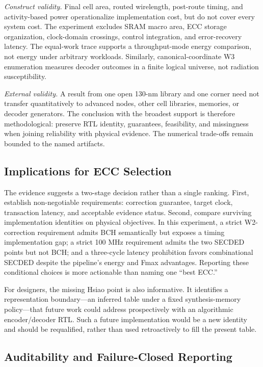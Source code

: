 \textit{Construct validity.} Final cell area, routed wirelength, post-route timing, and activity-based power operationalize implementation cost, but do not cover every system cost. The experiment excludes SRAM macro area, ECC storage organization, clock-domain crossings, control integration, and error-recovery latency. The equal-work trace supports a throughput-mode energy comparison, not energy under arbitrary workloads. Similarly, canonical-coordinate W3 enumeration measures decoder outcomes in a finite logical universe, not radiation susceptibility.

\textit{External validity.} A result from one open 130-nm library and one corner need not transfer quantitatively to advanced nodes, other cell libraries, memories, or decoder generators. The conclusion with the broadest support is therefore methodological: preserve RTL identity, guarantees, feasibility, and missingness when joining reliability with physical evidence. The numerical trade-offs remain bounded to the named artifacts.

\subsection{Implications for ECC Selection}

The evidence suggests a two-stage decision rather than a single ranking. First, establish non-negotiable requirements: correction guarantee, target clock, transaction latency, and acceptable evidence status. Second, compare surviving implementation identities on physical objectives. In this experiment, a strict W2-correction requirement admits BCH semantically but exposes a timing implementation gap; a strict 100 MHz requirement admits the two SECDED points but not BCH; and a three-cycle latency prohibition favors combinational SECDED despite the pipeline's energy and Fmax advantages. Reporting these conditional choices is more actionable than naming one ``best ECC.''

For designers, the missing Hsiao point is also informative. It identifies a representation boundary---an inferred table under a fixed synthesis-memory policy---that future work could address prospectively with an algorithmic encoder/decoder RTL. Such a future implementation would be a new identity and should be requalified, rather than used retroactively to fill the present table.

\subsection{Auditability and Failure-Closed Reporting}

